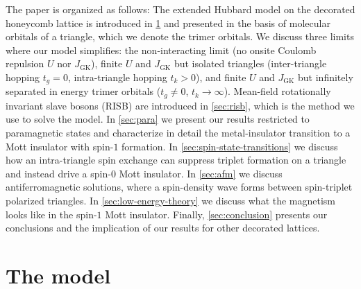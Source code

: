 \documentclass[reprint,aps,prb,amsmath,amssymb]{revtex4-2}
\begin{document}
The paper is organized as follows: The extended Hubbard model on the decorated honeycomb lattice is introduced in \cref{sec:model} and presented in the basis of molecular orbitals of a triangle, which we denote the trimer orbitals. We discuss three limits where our model simplifies: the non-interacting limit (no onsite Coulomb repulsion $U$ nor $J_{\mathrm{GK}}$), finite $U$ and $J_{\mathrm{GK}}$ but isolated triangles (inter-triangle hopping $t_g = 0$, intra-triangle hopping $t_k > 0$), and finite $U$ and $J_{\mathrm{GK}}$ but infinitely separated in energy trimer orbitals ($t_g \neq 0$, $t_k \rightarrow \infty$). Mean-field rotationally invariant slave bosons (RISB) are introduced in \cref{sec:risb}, which is the method we use to solve the model. In \cref{sec:para} we present our results restricted to paramagnetic states and characterize in detail the metal-insulator transition to a Mott insulator with spin-$1$ formation. In \cref{sec:spin-state-transitions} we discuss how an intra-triangle spin exchange can suppress triplet formation on a triangle and instead drive a spin-$0$ Mott insulator. In \cref{sec:afm} we discuss antiferromagnetic solutions, where a spin-density wave forms between spin-triplet polarized triangles. In \cref{sec:low-energy-theory} we discuss what the magnetism looks like in the spin-$1$ Mott insulator. Finally, \cref{sec:conclusion} presents our conclusions and the implication of our results for other decorated lattices.

\section{The model} \label{sec:model}
\end{document}
